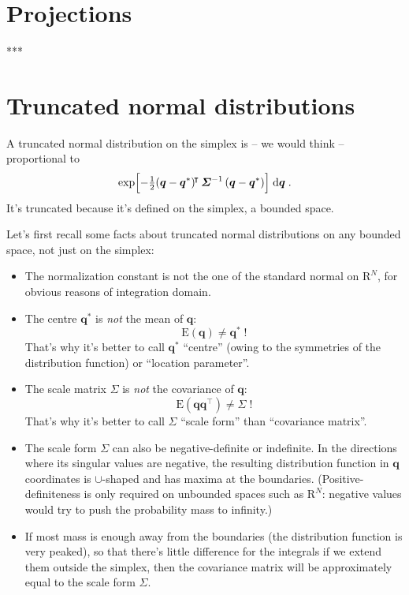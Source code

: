 \documentclass[\ifafour a4paper,12pt,\else a5paper,10pt,\fi%
onecolumn,oneside,article,%
british%
]{memoir}
\theoremstyle{remark}
\theoremstyle{innote}
\newcommand*{\di}{\mathrm{d}}%
\newcommand*{\RR}{\bm{\mathrm{R}}}
\newcommand*{\E}{\mathrm{E}}
\renewcommand*{\|}[1][]{\nonscript\,#1\vert\nonscript\;\mathopen{}}
\newcommand*{\T}{^{\mathord{\!\intercal}}}%
\newcommand*{\yq}{\bm{q}}
\newcommand*{\yqr}{\yq^{*}}
\newcommand*{\ySigma}{\bm{\varSigma}}
\begin{document}
\section{Projections}
\label{sec:projections}

***

\section{Truncated normal distributions}
\label{sec:normal_distr}

A truncated normal distribution on the simplex is -- we would think --
proportional to
\begin{equation}
  \label{eq:normal}
\exp\Bigl[-\tfrac{1}{2}
(\yq-\yqr)\T \, \ySigma^{-1}\, (\yq-\yqr)
  \Bigr] \;\di\yq\;.
\end{equation}
It's truncated because it's defined on the simplex, a bounded space.

Let's first recall some facts about truncated normal distributions on any
bounded space, not just on the simplex:
\begin{itemize}
\item The normalization constant is not the one of the standard
  normal on $\RR^{N}$, for obvious reasons of integration domain.
\item The centre $\yqr$ is \emph{not} the mean of $\yq$:
  \begin{equation}
    \label{eq:normal_not_mean}
    \E(\yq) \ne \yqr \;!
  \end{equation}
  That's why it's better to call $\yqr$ \enquote{centre} (owing to the
  symmetries of the distribution function) or \enquote{location parameter}.
\item The scale matrix $\ySigma$ is \emph{not} the covariance of $\yq$:
  \begin{equation}
    \label{eq:normal_not_cov}
    \E(\yq\yq\T) \ne \ySigma \;!
  \end{equation}
  That's why it's better to call $\ySigma$ \enquote{scale form} than
  \enquote{covariance matrix}.
\item The scale form $\ySigma$ can also be negative-definite or
  indefinite. In the directions where its singular values are negative, the
  resulting distribution function in $\yq$ coordinates is $\cup$-shaped and
  has maxima at the boundaries. (Positive-definiteness is only required on
  unbounded spaces such as $\RR^{N}$: negative values would try to push the
  probability mass to infinity.)
\item If most mass is enough away from the boundaries (the distribution
  function is very peaked), so that there's little difference for the
  integrals if we extend them outside the simplex, then the covariance
  matrix will be approximately equal to the scale form $\ySigma$.
\end{itemize}
\end{document}
